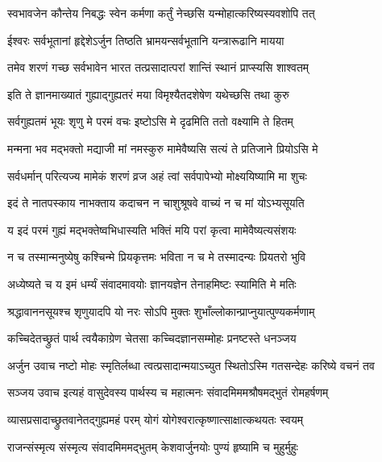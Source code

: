 \twolineshloka
{स्वभावजेन कौन्तेय निबद्धः स्वेन कर्मणा}
{कर्तुं नेच्छसि यन्मोहात्करिष्यस्यवशोपि तत्}%

\twolineshloka
{ईश्वरः सर्वभूतानां हृद्देशेऽर्जुन तिष्ठति}
{भ्रामयन्सर्वभूतानि यन्त्रारूढानि मायया}%

\twolineshloka
{तमेव शरणं गच्छ सर्वभावेन भारत}
{तत्प्रसादात्परां शान्तिं स्थानं प्राप्स्यसि शाश्वतम्}
{}%

\twolineshloka
{इति ते ज्ञानमाख्यातं गुह्याद्गुह्यतरं मया}
{विमृश्यैतदशेषेण यथेच्छसि तथा कुरु}%

\twolineshloka
{सर्वगुह्यतमं भूयः शृणु मे परमं वचः}
{इष्टोऽसि मे दृढमिति ततो वक्ष्यामि ते हितम्}%

\twolineshloka
{मन्मना भव मद्भक्तो मद्याजी मां नमस्कुरु}
{मामेवैष्यसि सत्यं ते प्रतिजाने प्रियोऽसि मे}%

\twolineshloka
{सर्वधर्मान् परित्यज्य मामेकं शरणं व्रज}
{अहं त्वां सर्वपापेभ्यो मोक्ष्ययिष्यामि मा शुचः}%

\twolineshloka
{इदं ते नातपस्काय नाभक्ताय कदाचन}
{न चाशुश्रूषवे वाच्यं न च मां योऽभ्यसूयति}%

\twolineshloka
{य इदं परमं गुह्यं मद्भक्तेष्वभिधास्यति}
{भक्तिं मयि परां कृत्वा मामेवैष्यत्यसंशयः}%

\twolineshloka
{न च तस्मान्मनुष्येषु कश्चिन्मे प्रियकृत्तमः}
{भविता न च मे तस्मादन्यः प्रियतरो भुवि}%

\twolineshloka
{अध्येष्यते च य इमं धर्म्यं संवादमावयोः}
{ज्ञानयज्ञेन तेनाहमिष्टः स्यामिति मे मतिः}%

\twolineshloka
{श्रद्धावाननसूयश्च शृणुयादपि यो नरः}
{सोऽपि मुक्तः शुभाँल्लोकान्प्राप्नुयात्पुण्यकर्मणाम्}%

\twolineshloka
{कच्चिदेतच्छ्रुतं पार्थ त्वयैकाग्रेण चेतसा}
{कच्चिदज्ञानसम्मोहः प्रनष्टस्ते धनञ्जय}%

{अर्जुन उवाच}
\twolineshloka
{नष्टो मोहः स्मृतिर्लब्धा त्वत्प्रसादान्मयाऽच्युत}
{स्थितोऽस्मि गतसन्देहः करिष्ये वचनं तव}%

{सञ्जय उवाच}
\twolineshloka
{इत्यहं वासुदेवस्य पार्थस्य च महात्मनः}
{संवादमिममश्रौषमद्भुतं रोमहर्षणम्}%

\twolineshloka
{व्यासप्रसादाच्छ्रुतवानेतद्गुह्यमहं परम्}
{योगं योगेश्वरात्कृष्णात्साक्षात्कथयतः स्वयम्}%

\twolineshloka
{राजन्संस्मृत्य संस्मृत्य संवादमिममद्भुतम्}
{केशवार्जुनयोः पुण्यं हृष्यामि च मुहुर्मुहुः}%

